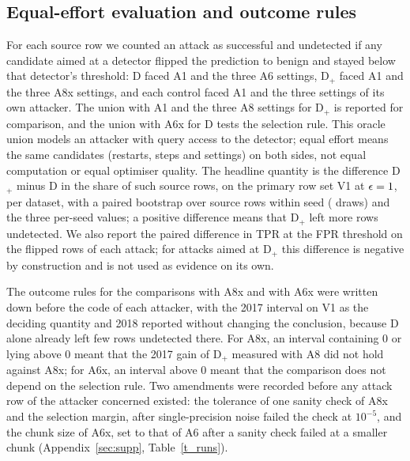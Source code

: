 \subsection{Equal-effort evaluation and outcome rules}
\label{sec:protocol}
For each source row we counted an attack as successful and undetected if any candidate aimed at a detector flipped the
prediction to benign and stayed below that detector's threshold: D faced A1 and the three A6 settings, D$_+$ faced A1
and the three A8x settings, and each control faced A1 and the three settings of its own attacker.
The union with A1 and the three A8 settings for D$_+$ is reported for comparison, and the union with A6x for D tests the
selection rule.
This oracle union models an attacker with query access to the detector; equal effort means the same candidates
(restarts, steps and settings) on both sides, not equal computation or equal optimiser quality.
The headline quantity is the difference D$_+$ minus D in the share of such source rows, on the primary row set V1 at
$\epsilon = 1$, per dataset, with a paired bootstrap over source rows within seed (\paramBoot{} draws) and
the three per-seed values; a positive difference means that D$_+$ left more rows undetected.
We also report the paired difference in TPR at the \paramFPR{} FPR threshold on the flipped rows of each attack; for
attacks aimed at D$_+$ this difference is negative by construction and is not used as evidence on its own.

The outcome rules for the comparisons with A8x and with A6x were written down before the code of each attacker, with
the 2017 interval on V1 as the deciding quantity and 2018 reported without changing the conclusion, because D alone
already left few rows undetected there.
For A8x, an interval containing $0$ or lying above $0$ meant that the 2017 gain of D$_+$ measured with A8 did not hold
against A8x; for A6x, an interval above $0$ meant that the comparison does not depend on the selection rule.
Two amendments were recorded before any attack row of the attacker concerned existed: the tolerance of one sanity check
of A8x and the \axMargin{} selection margin, after single-precision noise failed the check at $10^{-5}$, and the chunk
size of A6x, set to that of A6 after a sanity check failed at a smaller chunk (Appendix~\ref{sec:supp},
Table~\ref{t_runs}).
